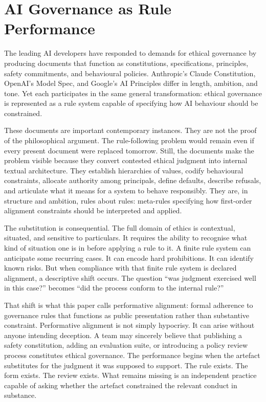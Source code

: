 \documentclass[11pt,a4paper]{article}
\begin{document}
\section{AI Governance as Rule Performance}

The leading AI developers have responded to demands for ethical governance by producing documents that function as constitutions, specifications, principles, safety commitments, and behavioural policies. Anthropic's Claude Constitution, OpenAI's Model Spec, and Google's AI Principles differ in length, ambition, and tone. Yet each participates in the same general transformation: ethical governance is represented as a rule system capable of specifying how AI behaviour should be constrained.

These documents are important contemporary instances. They are not the proof of the philosophical argument. The rule-following problem would remain even if every present document were replaced tomorrow. Still, the documents make the problem visible because they convert contested ethical judgment into internal textual architecture. They establish hierarchies of values, codify behavioural constraints, allocate authority among principals, define defaults, describe refusals, and articulate what it means for a system to behave responsibly. They are, in structure and ambition, rules about rules: meta-rules specifying how first-order alignment constraints should be interpreted and applied.

The substitution is consequential. The full domain of ethics is contextual, situated, and sensitive to particulars. It requires the ability to recognise what kind of situation one is in before applying a rule to it. A finite rule system can anticipate some recurring cases. It can encode hard prohibitions. It can identify known risks. But when compliance with that finite rule system is declared alignment, a descriptive shift occurs. The question ``was judgment exercised well in this case?'' becomes ``did the process conform to the internal rule?''

That shift is what this paper calls performative alignment: formal adherence to governance rules that functions as public presentation rather than substantive constraint. Performative alignment is not simply hypocrisy. It can arise without anyone intending deception. A team may sincerely believe that publishing a safety constitution, adding an evaluation suite, or introducing a policy review process constitutes ethical governance. The performance begins when the artefact substitutes for the judgment it was supposed to support. The rule exists. The form exists. The review exists. What remains missing is an independent practice capable of asking whether the artefact constrained the relevant conduct in substance.
\end{document}
